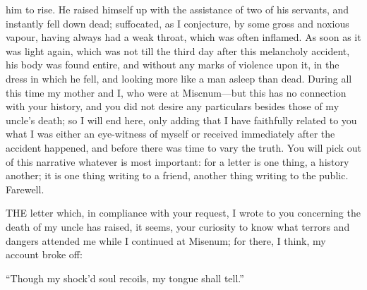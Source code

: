 him to rise. He raised himself up with the assistance of two of his
servants, and instantly fell down dead; suffocated, as I conjecture, by
some gross and noxious vapour, having always had a weak throat, which was
often inflamed. As soon as it was light again, which was not till the
third day after this melancholy accident, his body was found entire, and
without any marks of violence upon it, in the dress in which he fell, and
looking more like a man asleep than dead. During all this time my mother
and I, who were at Miscnum—but this has no connection with your
history, and you did not desire any particulars besides those of my
uncle's death; so I will end here, only adding that I have faithfully
related to you what I was either an eye-witness of myself or received
immediately after the accident happened, and before there was time to vary
the truth. You will pick out of this narrative whatever is most important:
for a letter is one thing, a history another; it is one thing writing to a
friend, another thing writing to the public. Farewell.


THE letter which, in compliance with your request, I wrote to you
concerning the death of my uncle has raised, it seems, your curiosity to
know what terrors and dangers attended me while I continued at Misenum;
for there, I think, my account broke off:

``Though my shock'd soul recoils, my tongue shall tell.''

